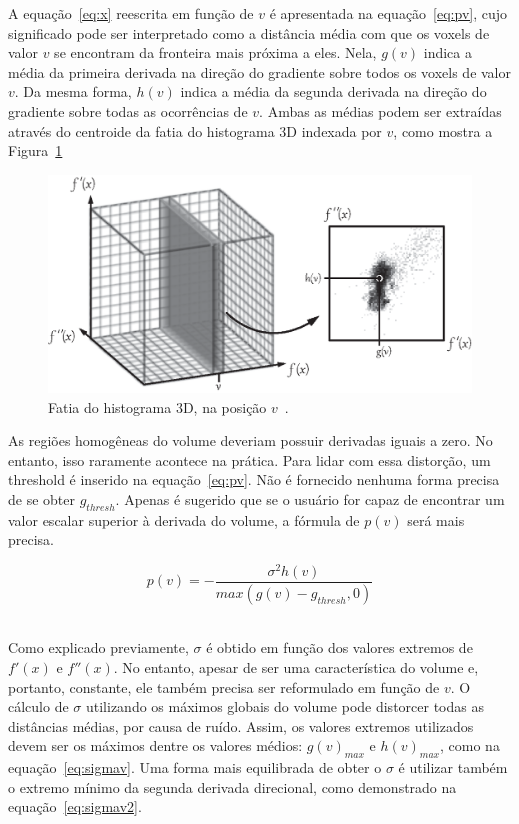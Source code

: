 	A equação~\eqref{eq:x} reescrita em função de $v$ é apresentada na equação~\eqref{eq:pv}, cujo significado pode ser interpretado como a distância média com que os voxels de valor $v$ se encontram da fronteira mais próxima a eles. Nela, $g(v)$ indica a média da primeira derivada na direção do gradiente sobre todos os voxels de valor $v$. Da mesma forma, $h(v)$ indica a média da segunda derivada na direção do gradiente sobre todas as ocorrências de $v$. Ambas as médias podem ser extraídas através do centroide da fatia do histograma 3D indexada por $ v $, como mostra a Figura~\ref{fig:g_hv}
	
\begin{figure}[h]
	\centering
	\includegraphics[width=1\textwidth]{images/g_hv}
	\caption{Fatia do histograma 3D, na posição $ v $~\cite{gordonms}.}
	\label{fig:g_hv}
\end{figure}

	As regiões homogêneas do volume deveriam possuir derivadas iguais a zero. No entanto, isso raramente acontece na prática. Para lidar com essa distorção, um threshold é inserido na equação~\eqref{eq:pv}. Não é fornecido nenhuma forma precisa de se obter $ g_{thresh} $. Apenas é sugerido que se o usuário for capaz de encontrar um valor escalar superior à derivada  do volume, a fórmula de $ p(v) $ será mais precisa.

\begin{equation} \label{eq:pv}
	p(v) = -\frac{\sigma^{2}h(v)}{max(g(v) - g_{thresh}, 0)}
\end{equation} \

	Como explicado previamente, $\sigma$ é obtido em função dos valores extremos de $f'(x)$ e $f''(x)$. No entanto, apesar de ser uma característica do volume e, portanto, constante, ele também precisa ser reformulado em função de $v$. O cálculo de $\sigma$ utilizando os máximos globais do volume pode distorcer todas as distâncias médias, por causa de ruído. Assim, os valores extremos utilizados devem ser os máximos dentre os valores médios: $g(v)_{max}$ e $h(v)_{max}$, como na equação~\eqref{eq:sigmav}. Uma forma mais equilibrada de obter o $\sigma$ é utilizar também o extremo mínimo da segunda derivada direcional, como demonstrado na equação~\eqref{eq:sigmav2}.
	
